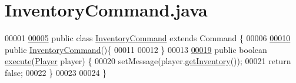 \hypertarget{InventoryCommand_8java_source}{\section{Inventory\-Command.\-java}
}

\begin{DoxyCode}
00001 
\hypertarget{InventoryCommand_8java_source_l00005}{}\hyperlink{classInventoryCommand}{00005} \textcolor{keyword}{public} \textcolor{keyword}{class }\hyperlink{classInventoryCommand}{InventoryCommand} \textcolor{keyword}{extends} Command \{
00006 
\hypertarget{InventoryCommand_8java_source_l00010}{}\hyperlink{classInventoryCommand_a8734205a1ed7afa3705737a03f234f34}{00010}     \textcolor{keyword}{public} \hyperlink{classInventoryCommand_a8734205a1ed7afa3705737a03f234f34}{InventoryCommand}()\{
00011 
00012     \}
00013 
\hypertarget{InventoryCommand_8java_source_l00019}{}\hyperlink{classInventoryCommand_a103714a9704895e9d8ddd5bcd758e5f8}{00019}     \textcolor{keyword}{public} \textcolor{keywordtype}{boolean} \hyperlink{classInventoryCommand_a103714a9704895e9d8ddd5bcd758e5f8}{execute}(\hyperlink{classPlayer}{Player} player) \{
00020         setMessage(player.\hyperlink{classPlayer_a5c4667e6eca93d1bba69f7db022f2feb}{getInventory}());
00021         \textcolor{keywordflow}{return} \textcolor{keyword}{false};
00022     \}
00023 
00024 \}
\end{DoxyCode}

